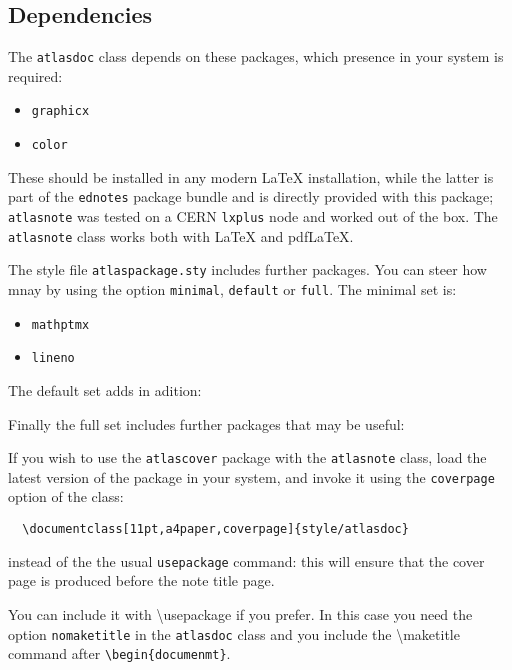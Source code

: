 \documentclass{style/atlasdoc}
\newcommand{\Macro}[1]{\textbackslash #1\xspace}
\begin{document}
\subsection{Dependencies}

The \texttt{atlasdoc} class depends on these packages, which presence in
your system is required:
\begin{itemize}
\item \texttt{graphicx}
\item \texttt{color}
\end{itemize}
These should be installed in any modern \LaTeX{}
installation, while the latter is part of the {\tt ednotes} package
bundle and is directly provided with this package; \texttt{atlasnote} was
tested on a CERN \texttt{lxplus} node and worked out of the box. 
The \texttt{atlasnote} class works both with \LaTeX{} and pdf\LaTeX{}.

The style file \texttt{atlaspackage.sty} includes further packages.
You can steer how mnay by using the option \texttt{minimal}, \texttt{default} or \texttt{full}.
The minimal set is:
\begin{itemize}
\item \texttt{mathptmx}
\item \texttt{lineno}
\end{itemize}

The default set adds in adition:

Finally the full set includes further packages that may be useful:

If you wish to use the \texttt{atlascover} package with the 
\texttt{atlasnote} class, load the latest version of the package in your
system, and invoke it using the \texttt{coverpage} option of the class:
\begin{verbatim}
  \documentclass[11pt,a4paper,coverpage]{style/atlasdoc}
\end{verbatim}
instead of the the usual \texttt{usepackage} command: this will ensure
that the cover page is produced before the note title page.

You can include it with \Macro{usepackage} if you prefer.
In this case you need the option \texttt{nomaketitle} in the \texttt{atlasdoc} class
and you include the \Macro{maketitle} command after \verb|\begin{documenmt}|.

\end{document}
